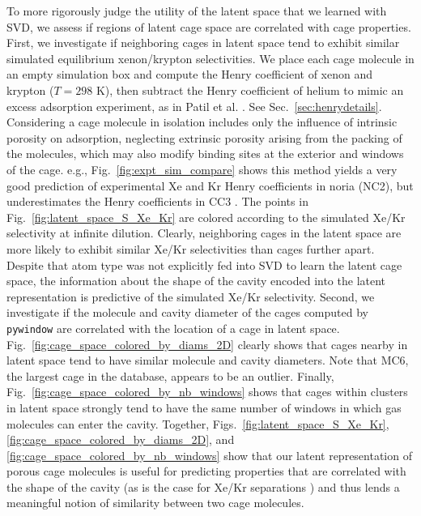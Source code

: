 \documentclass[journal=jacsat,manuscript=article,layout=traditional]{achemso}
\begin{document}
To more rigorously judge the utility of the latent space that we learned with SVD, we assess if regions of latent cage space are correlated with cage properties.
First, we investigate if neighboring cages in latent space tend to exhibit similar simulated equilibrium xenon/krypton selectivities.
We place each cage molecule in an empty simulation box and compute the Henry coefficient of xenon and krypton ($T=298$ K), then subtract the Henry coefficient of helium to mimic an excess adsorption experiment, as in Patil et al. \cite{patil2016noria}. See Sec.~\ref{sec:henrydetails}.
Considering a cage molecule in isolation includes only the influence of intrinsic porosity on adsorption, neglecting extrinsic porosity arising from the packing of the molecules, which may also modify binding sites at the exterior and windows of the cage. e.g., Fig.~\ref{fig:expt_sim_compare} shows this method yields a very good prediction of experimental Xe and Kr Henry coefficients in noria \cite{patil2016noria} (NC2), but underestimates the Henry coefficients in CC3 \cite{chen2014separation}.
The points in Fig.~\ref{fig:latent_space_S_Xe_Kr} are colored according to the simulated Xe/Kr selectivity at infinite dilution. Clearly, neighboring cages in the latent space are more likely to exhibit similar Xe/Kr selectivities than cages further apart. Despite that atom type was not explicitly fed into SVD to learn the latent cage space, the information about the shape of the cavity encoded into the latent representation is predictive of the simulated Xe/Kr selectivity. 
Second, we investigate if the molecule and cavity diameter of the cages computed by \texttt{pywindow} \cite{miklitz2018pywindow} are correlated with the location of a cage in latent space. Fig.~\ref{fig:cage_space_colored_by_diams_2D} clearly shows that cages nearby in latent space tend to have similar molecule and cavity diameters. Note that MC6, the largest cage in the database, appears to be an outlier. Finally, Fig.~\ref{fig:cage_space_colored_by_nb_windows} shows that cages within clusters in latent space strongly tend to have the same number of windows in which gas molecules can enter the cavity.
Together, Figs.~\ref{fig:latent_space_S_Xe_Kr}, \ref{fig:cage_space_colored_by_diams_2D}, and \ref{fig:cage_space_colored_by_nb_windows} show that our latent representation of porous cage molecules is useful for predicting properties that are correlated with the shape of the cavity (as is the case for Xe/Kr separations \cite{sikora2012thermodynamic,simon2015best}) and thus lends a meaningful notion of similarity between two cage molecules.
\end{document}
